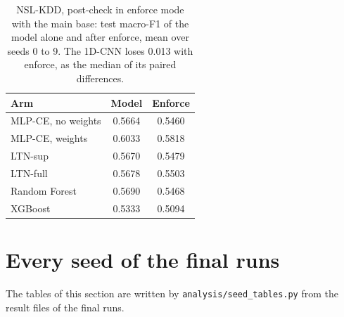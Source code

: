 \begin{table}[htbp]
\centering
\footnotesize
\caption{NSL-KDD, post-check in enforce mode with the main base: test macro-F1 of the model alone and after enforce,
mean over seeds 0 to 9. The 1D-CNN loses 0.013 with enforce, as the median of its paired differences.}
\label{tab:app-postcheck}
\setlength{\tabcolsep}{4pt}
\begin{tabular}{@{}lcc@{}}
\toprule
Arm & Model & Enforce \\
\midrule
MLP-CE, no weights & 0.5664 & 0.5460 \\
MLP-CE, weights    & 0.6033 & 0.5818 \\
LTN-sup            & 0.5670 & 0.5479 \\
LTN-full           & 0.5678 & 0.5503 \\
Random Forest      & 0.5690 & 0.5468 \\
XGBoost            & 0.5333 & 0.5094 \\
\bottomrule
\end{tabular}
\end{table}

\FloatBarrier
\section{Every seed of the final runs}

The tables of this section are written by \texttt{analysis/seed\_tables.py} from the result files
of the final runs.



